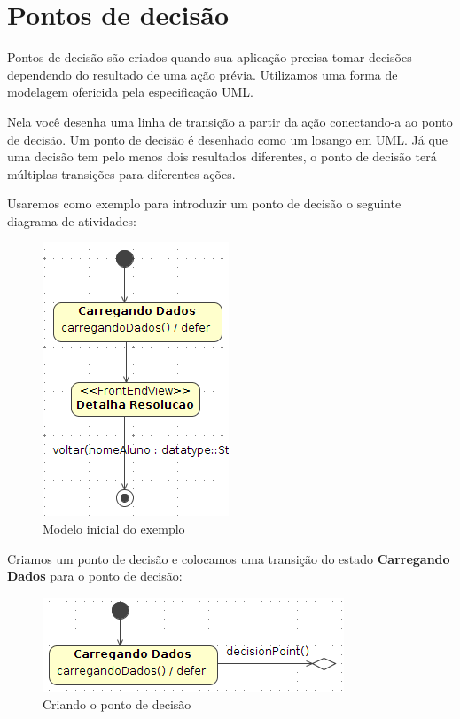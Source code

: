 \section{Pontos de decisão}

Pontos de decisão são criados quando sua aplicação precisa tomar decisões
dependendo do resultado de uma ação prévia. Utilizamos uma forma de modelagem
ofericida pela especificação UML.

Nela você desenha uma linha de transição a partir da ação conectando-a ao ponto
de decisão. Um ponto de decisão é desenhado como um losango em UML. Já que uma
decisão tem pelo menos dois resultados diferentes, o ponto de decisão terá
múltiplas transições para diferentes ações.

Usaremos como exemplo para introduzir um ponto de decisão o seguinte diagrama de
atividades:

\begin{figure}[H]
	\centering
	\includegraphics[scale=0.75]{files/imgs/decision-point-00.png}
	\caption{Modelo inicial do exemplo}
	\label{modelo_inicial_ponto_decisao}
\end{figure}

Criamos um ponto de decisão e colocamos uma transição do estado
\textbf{Carregando Dados} para o ponto de decisão:

\begin{figure}[H]
	\centering
	\includegraphics[scale=0.75]{files/imgs/decision-point-01.png}
	\caption{Criando o ponto de decisão}
	\label{criando_ponto_decisao}
\end{figure}

